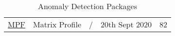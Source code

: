 \begin{table}[h]
{\begin{tabular}{lllll}
            \href{https://github.com/matrix-profile-foundation/matrixprofile}{MPF}                                  & Matrix Profile                                                                                                                                                                                                                                                                                                                                                                                                                & /         & 20th Sept 2020    & 82    \\
        \end{tabular}
    }
    \caption{Anomaly Detection Packages}\label{tab:ad-packages}
\end{table}




